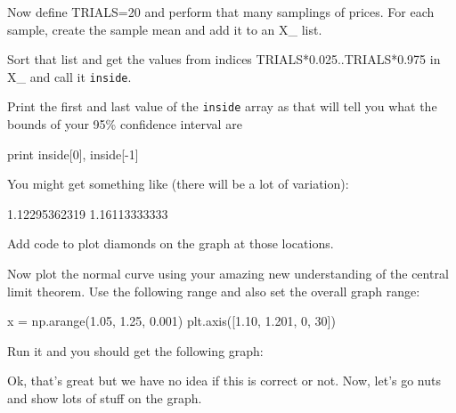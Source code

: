 \begin{fullwidth}
\step Now define TRIALS=20 and perform that many samplings of prices. For each sample, create the sample mean and add it to an X\_ list.

\step Sort that list and get the values from indices TRIALS*0.025..TRIALS*0.975 in X\_ and call it {\tt inside}.

\step Print the first and last value of the {\tt inside} array as that will tell you what the bounds of your 95\% confidence interval are

\begin{pyverbatim}
print inside[0], inside[-1]
\end{pyverbatim}

\noindent You might get something like (there will be a lot of variation):

1.12295362319 1.16113333333

\step Add code to plot diamonds on the graph at those locations.

\step Now plot the normal curve using your amazing new understanding of the central limit  theorem. Use the following range and also set the overall graph range:

\begin{pyverbatim}
x = np.arange(1.05, 1.25, 0.001)
plt.axis([1.10, 1.201, 0, 30])
\end{pyverbatim}

\step Run it and you should get the following graph:


Ok, that's great but we have no idea if this is correct or not. Now, let's go nuts and show lots of stuff on the graph.


\end{fullwidth}
